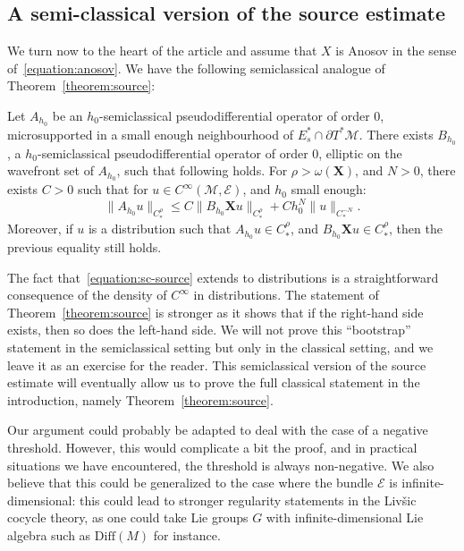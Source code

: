 \documentclass[AHL,Unicode,longabstracts,published]{cedram}
\newcommand{\X}{\mathbf{X}}
\newcommand{\M}{\mathcal{M}}
\newcommand{\E}{\mathcal{E}}
\newcommand{\Diff}{\mathrm{Diff}}
\begin{document}
\subsection{A semi-classical version of the source estimate}

We turn now to the heart of the article and assume that $X$ is Anosov in the sense of~\eqref{equation:anosov}. We have the following semiclassical analogue of Theorem~\ref{theorem:source}:

\begin{theo}\label{theorem:sc-source}
Let $A_{h_0}$ be an $h_0$-semiclassical pseudodifferential operator of order $0$, microsupported in a small enough neighbourhood of $E^\ast_s \cap \partial T^*\M$. There exists $B_{h_0}$, a $h_0$-semiclassical pseudodifferential operator of order $0$, elliptic on the wavefront set of $A_{h_0}$, such that following holds. For $\rho>\omega(\X)$, and $N>0$, there exists $C>0$ such that for $u\in C^\infty(\M,\E)$, and $h_0$ small enough:
\begin{equation}\label{equation:sc-source}
\| A_{h_0} u\|_{C^\rho_\ast} \leq C \| B_{h_0} \X u \|_{C^\rho_\ast} + Ch_0^N \| u \|_{C_*^{-N}}.
\end{equation}
Moreover, if $u$ is a distribution such that $A_{h_0} u \in C^\rho_\ast$, and $B_{h_0} \X u \in C^\rho_\ast$, then the previous equality still holds.
\end{theo}

The fact that~\eqref{equation:sc-source} extends to distributions is a straightforward consequence of the density of $C^\infty$ in distributions. The statement of Theorem~\ref{theorem:source} is stronger as it shows that if the right-hand side exists, then so does the left-hand side. We will not prove this ``bootstrap'' statement in the semiclassical setting but only in the classical setting, and we leave it as an exercise for the reader. This semiclassical version of the source estimate will eventually allow us to prove the full classical statement in the introduction, namely Theorem~\ref{theorem:source}.


Our argument could probably be adapted to deal with the case of a negative threshold. However, this would complicate a bit the proof, and in practical situations we have encountered, the threshold is always non-negative. We also believe that this could be generalized to the case where the bundle $\E$ is infinite-dimensional: this could lead to stronger regularity statements in the Liv{\v s}ic cocycle theory, as one could take Lie groups $G$ with infinite-dimensional Lie algebra such as $\Diff(M)$ for instance.
\end{document}
